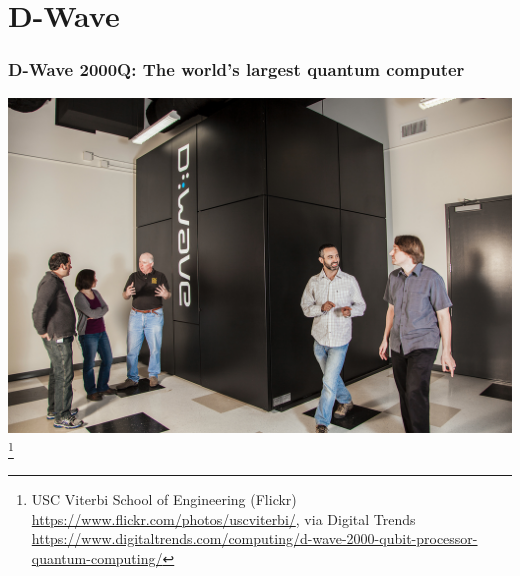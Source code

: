 \documentclass[]{beamer}
\begin{document}
\section{D-Wave}

\begin{frame}
\frametitle{D-Wave 2000Q: The world's largest quantum computer}

\begin{center}
\includegraphics[scale=0.16]{dwave}\footnote{USC Viterbi School of Engineering (Flickr) \url{https://www.flickr.com/photos/uscviterbi/}, via Digital Trends \url{https://www.digitaltrends.com/computing/d-wave-2000-qubit-processor-quantum-computing/}}
\end{center}
\end{frame}

\end{document}
